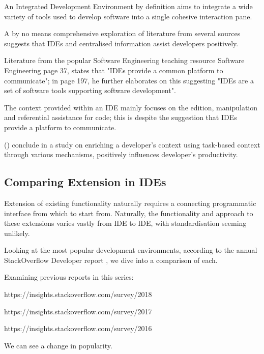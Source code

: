 An Integrated Development Environment by definition aims to integrate a wide variety of tools used to develop software into a single cohesive interaction pane. 

A by no means comprehensive exploration of literature from several sources suggests that IDEs and centralised information assist developers positively. 

Literature from the popular Software Engineering teaching resource Software Engineering \parencite{Sommerville:2010:SE:1841764} page 37, states that "IDEs provide a common platform to communicate"; in page 197, he further elaborates on this suggesting "IDEs are a set of software tools supporting software development".

The context provided within an IDE mainly focuses on the edition, manipulation and referential assistance for code; this is despite the suggestion that IDEs provide a platform to communicate.

\citeauthor{kersten2006using} () conclude in a study on enriching a developer's context using task-based context through various mechanisms, positively influences developer's productivity.

\subsection{Comparing Extension in IDEs}

Extension of existing functionality naturally requires a connecting programmatic interface from which to start from. Naturally, the functionality and approach to these extensions varies vastly from IDE to IDE, with standardisation seeming unlikely. 

Looking at the most popular development environments, according to the annual StackOverflow Developer report \parencite{stackOverflowDevReport2019}, we dive into a comparison of each.

Examining previous reports in this series: 

https://insights.stackoverflow.com/survey/2018

https://insights.stackoverflow.com/survey/2017

https://insights.stackoverflow.com/survey/2016

We can see a change in popularity.



